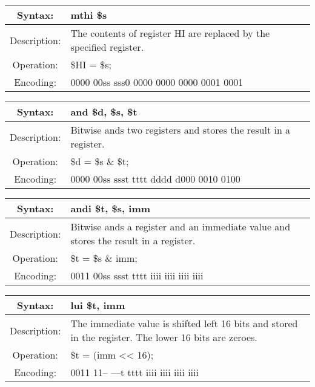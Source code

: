     \begin{table}[!hbp]
    \begin{tabularx}{\textwidth}{|c|X|}
        \hline
        Syntax: & mthi \$s \\
        \hline
        Description: & The contents of register HI are replaced by the specified register. \\
        \hline
        Operation: & \$HI = \$s; \\
        \hline
        Encoding: & 0000 00ss sss0 0000 0000 0000 0001 0001 \\
        \hline
    \end{tabularx}
    \end{table}

    \begin{table}[!hbp]
    \begin{tabularx}{\textwidth}{|c|X|}
        \hline
        Syntax: & and \$d, \$s, \$t \\
        \hline
        Description: & Bitwise ands two registers and stores the result in a register. \\
        \hline
        Operation: & \$d = \$s \& \$t; \\
        \hline
        Encoding: & 0000 00ss ssst tttt dddd d000 0010 0100 \\
        \hline
    \end{tabularx}
    \end{table}

    \begin{table}[!hbp]
    \begin{tabularx}{\textwidth}{|c|X|}
        \hline
        Syntax: & andi \$t, \$s, imm \\
        \hline
        Description: & Bitwise ands a register and an immediate value and stores the result in a register. \\
        \hline
        Operation: & \$t = \$s \& imm; \\
        \hline
        Encoding: & 0011 00ss ssst tttt iiii iiii iiii iiii \\
        \hline
    \end{tabularx}
    \end{table}

\clearpage  %

    \begin{table}[!hbp]
    \begin{tabularx}{\textwidth}{|c|X|}
        \hline
        Syntax: & lui \$t, imm \\
        \hline
        Description: & The immediate value is shifted left 16 bits and stored in the register.
                         The lower 16 bits are zeroes. \\
        \hline
        Operation: & \$t = (imm << 16); \\
        \hline
        Encoding: & 0011 11-- ---t tttt iiii iiii iiii iiii \\
        \hline
    \end{tabularx}
    \end{table}

